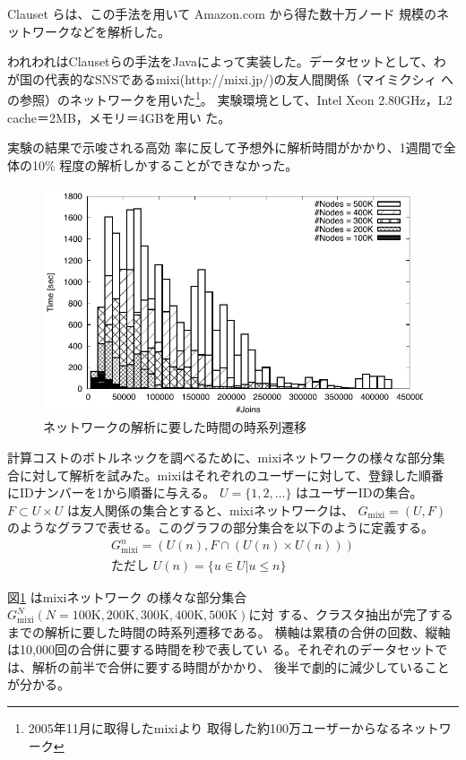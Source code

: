 \documentclass [a4j,11pt] {jsarticle}
\begin{document}
Clauset らは、この手法を用いて Amazon.com から得た数十万ノード
規模のネットワークなどを解析した。

われわれはClausetらの手法をJavaによって実装した。データセットとして、わ
が国の代表的なSNSであるmixi(http://mixi.jp/)の友人間関係（マイミクシィ
への参照）のネットワークを用いた\footnote {2005年11月に取得したmixiより
取得した約100万ユーザーからなるネットワーク}。
実験環境として、Intel Xeon 2.80GHz，L2 cache＝2MB，メモリ＝4GBを用い
た。

実験の結果\cite{Clauset04}で示唆される高効
率に反して予想外に解析時間がかかり、1週間で全体の10\%
程度の解析しかすることができなかった。

\begin {figure}[htbp]
  \centerline {\includegraphics [width=0.80\linewidth]{fig2-cnm-joins-time-series.pdf}}
  \caption {ネットワークの解析に要した時間の時系列遷移}
  \label {fig: newman time diff}
\end{figure}

計算コストのボトルネックを調べるために、mixiネットワークの様々な部分集
合に対して解析を試みた。mixiはそれぞれのユーザーに対して、登録した順番
にIDナンバーを1から順番に与える。
$U= \{1,2,\ldots\}$
はユーザーIDの集合。
$F \subset U\times U$
は友人関係の集合とすると、mixiネットワークは、
$G_{\text {mixi}} = (U, F)$
のようなグラフで表せる。このグラフの部分集合を以下のように定義する。
%
\begin {align*}
  G_{\text {mixi}}^n = (U(n), F \cap (U(n) \times U(n))) \\
  \text {ただし } U(n) = \{ u \in U | u \le n \}
\end {align*}

図\ref {fig: newman time diff} はmixiネットワーク
の様々な部分集合$G_{\text {mixi}}^N (N = \text {100K}, \text {200K},
\text {300K}, \text {400K}, \text {500K})$に対
する、クラスタ抽出が完了するまでの解析に要した時間の時系列遷移である。
横軸は累積の合併の回数、縦軸は10,000回の合併に要する時間を秒で表してい
る。それぞれのデータセットでは、解析の前半で合併に要する時間がかかり、
後半で劇的に減少していることが分かる。
\end{document}

